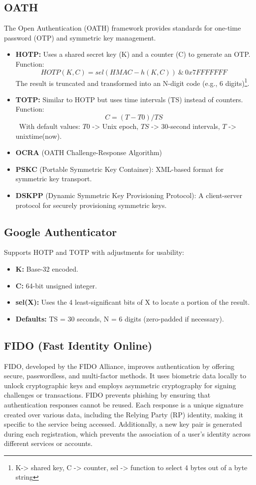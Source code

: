 \subsection{OATH}
The Open Authentication (OATH) framework provides standards for one-time password (OTP) and symmetric key management.
\begin{itemize}
    \item \textbf{HOTP:} Uses a shared secret key (K) and a counter (C) to generate an OTP.
    \\Function:
    \[ HOTP(K, C) = sel(HMAC-h(K, C))\ \&\ 0x7FFFFFFF\] 
    The result is truncated and transformed into an N-digit code (e.g., 6 digits)\footnote{K-> shared key, C -> counter, sel -> function to select 4 bytes out of a byte string}.
    
    \item \textbf{TOTP:} Similar to HOTP but uses time intervals (TS) instead of counters.\\
    Function:
    \[C = (T - T0) / TS\]\
    With default values: \(T0\) -> Unix epoch, \(TS\) -> 30-second intervals, \(T\) -> unixtime(now).
    \item \textbf{OCRA} (OATH Challenge-Response Algorithm)
    \item \textbf{PSKC} (Portable Symmetric Key Container): XML-based format for symmetric key transport.
    \item \textbf{DSKPP} (Dynamic Symmetric Key Provisioning Protocol): A client-server protocol for securely provisioning symmetric keys.
\end{itemize}

\subsection{Google Authenticator}
Supports HOTP and TOTP with adjustments for usability:
\begin{itemize}
    \item \textbf{K:} Base-32 encoded.
    \item \textbf{C:} 64-bit unsigned integer.
    \item \textbf{sel(X):} Uses the 4 least-significant bits of X to locate a portion of the result.
    \item \textbf{Defaults:} TS = 30 seconds, N = 6 digits (zero-padded if necessary).
\end{itemize}

\subsection{FIDO (Fast Identity Online)}
FIDO, developed by the FIDO Alliance, improves authentication by offering secure, passwordless, and multi-factor methods. It uses biometric data locally to unlock cryptographic keys and employs asymmetric cryptography for signing challenges or transactions. FIDO prevents phishing by ensuring that authentication responses cannot be reused. Each response is a unique signature created over various data, including the Relying Party (RP) identity, making it specific to the service being accessed. Additionally, a new key pair is generated during each registration, which prevents the association of a user’s identity across different services or accounts.
